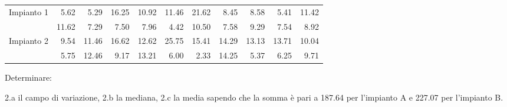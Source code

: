\documentclass[
  11pt,
]{book}
\theoremstyle{mytheoremstyle}
\theoremstyle{mydefstyle}
\begin{document}
\begin{tabular}{lrrrrrrrrrr}
\toprule
Impianto 1 & 5.62 & 5.29 & 16.25 & 10.92 & 11.46 & 21.62 & 8.45 & 8.58 & 5.41 & 11.42\\
 & 11.62 & 7.29 & 7.50 & 7.96 & 4.42 & 10.50 & 7.58 & 9.29 & 7.54 & 8.92\\
Impianto 2 & 9.54 & 11.46 & 16.62 & 12.62 & 25.75 & 15.41 & 14.29 & 13.13 & 13.71 & 10.04\\
 & 5.75 & 12.46 & 9.17 & 13.21 & 6.00 & 2.33 & 14.25 & 5.37 & 6.25 & 9.71\\
\bottomrule
\end{tabular}

Determinare:

2.a il campo di variazione,
2.b la mediana,
2.c la media sapendo che la somma è pari a 187.64 per l'impianto A e 227.07 per l'impianto B.
\end{document}
